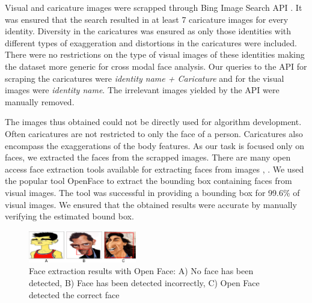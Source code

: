 Visual and caricature images were scrapped through Bing Image Search API \cite{BingSearch}. It was ensured that the search resulted in at least 7 caricature images for every identity. 
Diversity in the caricatures was ensured as only those identities with different types of exaggeration and distortions in the caricatures were included. There were no restrictions on the type of visual images of these identities making the dataset more generic for cross modal face analysis. Our queries to the API for scraping the caricatures were \textit{identity name + Caricature} and for the visual images were \textit{identity name}. The irrelevant images yielded by the API were manually removed. 

 

The images thus obtained could not be directly used for algorithm development. Often caricatures are not restricted to only the face of a person. Caricatures also encompass the exaggerations of the body features. As our task is focused only on faces, we extracted the faces from the scrapped images. There are many open access face extraction tools available for extracting faces from images \cite{amos2016openface}, \cite{Viola_jones}. We used the popular tool OpenFace\cite{amos2016openface} to extract the bounding box containing faces from visual images. The tool was successful in providing a bounding box for 99.6\% of visual images. We ensured that the obtained results were accurate by manually verifying the estimated bound box.

\begin{figure}[h]
\centering
\includegraphics[width=0.42\textwidth]{images/openface.png}
\caption{Face extraction results with Open Face: A) No face has been detected, B) Face has been detected incorrectly, C) Open Face detected the correct face}
\label{fig:face extraction sample}
\end{figure}

